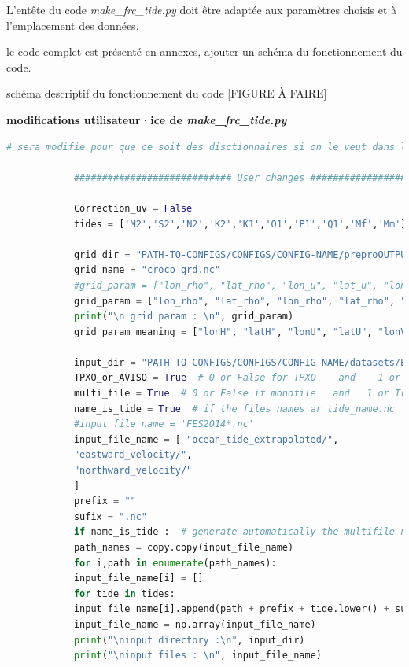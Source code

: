 \documentclass[10pt,a4paper,titlepage]{article}
\begin{document}
    L'entête du code \textit{make\_frc\_tide.py} doit être adaptée aux paramètres choisis et à l'emplacement des données.
    
    le code complet est présenté en annexes, ajouter un schéma du fonctionnement du code.
    
    schéma descriptif du fonctionnement du code [FIGURE À FAIRE]
    
    \begin{codeEnv}{\textbf{modifications utilisateur·ice de \textit{make\_frc\_tide.py}}}
        \begin{lstlisting}[language=python]
            # sera modifie pour que ce soit des disctionnaires si on le veut dans le rapport
            
            ############################ User changes ############################
            
            Correction_uv = False
            tides = ['M2','S2','N2','K2','K1','O1','P1','Q1','Mf','Mm']
            
            grid_dir = "PATH-TO-CONFIGS/CONFIGS/CONFIG-NAME/preproOUTPUT/"
            grid_name = "croco_grd.nc"
            #grid_param = ["lon_rho", "lat_rho", "lon_u", "lat_u", "lon_v", "lat_v"]
            grid_param = ["lon_rho", "lat_rho", "lon_rho", "lat_rho", "lon_rho", "lat_rho"]
            print("\n grid param : \n", grid_param)
            grid_param_meaning = ["lonH", "latH", "lonU", "latU", "lonV", "latV"]  # don't change this order
            
            input_dir = "PATH-TO-CONFIGS/CONFIGS/CONFIG-NAME/datasets/Bry/AVISO/"
            TPXO_or_AVISO = True  # 0 or False for TPXO    and    1 or True for AVISO
            multi_file = True  # 0 or False if monofile   and   1 or True if multifile
            name_is_tide = True  # if the files names ar tide_name.nc
            #input_file_name = 'FES2014*.nc'
            input_file_name = [ "ocean_tide_extrapolated/",
            "eastward_velocity/",
            "northward_velocity/"
            ]
            prefix = ""
            sufix = ".nc"
            if name_is_tide :  # generate automatically the multifile names
            path_names = copy.copy(input_file_name)
            for i,path in enumerate(path_names):
            input_file_name[i] = []
            for tide in tides:
            input_file_name[i].append(path + prefix + tide.lower() + sufix)
            input_file_name = np.array(input_file_name)
            print("\ninput directory :\n", input_dir)
            print("\ninput files : \n", input_file_name)
            

\end{lstlisting}
\end{codeEnv}
\end{document}
